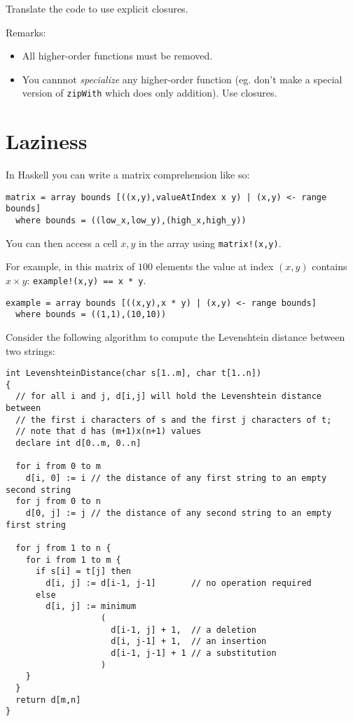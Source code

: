 \documentclass{article}
\begin{document}
Translate the code to use explicit closures. 

Remarks:
\begin{itemize}
\item All higher-order functions must be removed.
\item You cannnot \emph{specialize} any higher-order function
  (eg. don't make a special version of \texttt{zipWith} which does
  only addition).  Use closures.
\end{itemize}

\newpage
\section{Laziness}

In Haskell you can write a matrix comprehension like so:
\begin{verbatim}
matrix = array bounds [((x,y),valueAtIndex x y) | (x,y) <- range bounds]
  where bounds = ((low_x,low_y),(high_x,high_y))
\end{verbatim}

You can then access a cell $x,y$ in the array using \texttt{matrix!(x,y)}.

For example, in this matrix of $100$ elements the value at index $(x,y)$ contains $x ×
y$: \texttt{example!(x,y) == x * y}.
\begin{verbatim}
example = array bounds [((x,y),x * y) | (x,y) <- range bounds]
  where bounds = ((1,1),(10,10))
\end{verbatim}


Consider the following algorithm to compute the Levenshtein distance between two strings:
{\small
\begin{verbatim}
int LevenshteinDistance(char s[1..m], char t[1..n])
{
  // for all i and j, d[i,j] will hold the Levenshtein distance between
  // the first i characters of s and the first j characters of t;
  // note that d has (m+1)x(n+1) values
  declare int d[0..m, 0..n]

  for i from 0 to m
    d[i, 0] := i // the distance of any first string to an empty second string
  for j from 0 to n
    d[0, j] := j // the distance of any second string to an empty first string

  for j from 1 to n {
    for i from 1 to m {
      if s[i] = t[j] then
        d[i, j] := d[i-1, j-1]       // no operation required
      else
        d[i, j] := minimum
                   (
                     d[i-1, j] + 1,  // a deletion
                     d[i, j-1] + 1,  // an insertion
                     d[i-1, j-1] + 1 // a substitution
                   )
    }
  }
  return d[m,n]
}
\end{verbatim}
}
\end{document}
